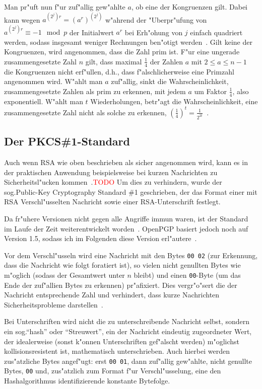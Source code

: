 \documentclass[12pt]{article}
\newcommand{\todo}[1]{\textcolor{red}{\mbox{TODO}}\marginpar{\textcolor{red}{#1}}}
\begin{document}
Man pr"uft nun f"ur zuf"allig gew"ahlte $a$, ob eine der Kongruenzen gilt.
Dabei kann wegen $a^{(2^j)r} = (a^r)^{(2^j)}$ w"ahrend der "Uberpr"ufung von
$a^{(2^j)r} \equiv -1 \mod p$ der Initialwert $a^r$ bei Erh"ohung von $j$ einfach quadriert werden,
sodass insgesamt weniger Rechnungen ben"otigt werden~\cite{hac}.
Gilt keine der Kongruenzen, wird angenommen, dass die Zahl prim ist.
F"ur eine ungerade zusammengesetzte Zahl $n$ gilt,
dass maximal $\frac{1}{4}$ der Zahlen $a$ mit $2 \leq a \leq n-1$ die Kongruenzen nicht erf"ullen,
d.h., dass f"alschlicherweise eine Primzahl angenommen wird.
W"ahlt man $a$ zuf"allig, sinkt die Wahrscheinlichkeit, zusammengesetzte Zahlen als prim zu erkennen,
mit jedem $a$ um Faktor $\frac{1}{4}$, also exponentiell.
W"ahlt man $t$ Wiederholungen, betr"agt die Wahrscheinlichkeit, eine zusammengesetzte Zahl nicht als solche zu erkennen,
$\left(\frac{1}{4}\right)^t = \frac{1}{2^{2t}}$~\cite{hac}.

\subsection{Der PKCS\#1-Standard}

Auch wenn RSA wie oben beschrieben als sicher angenommen wird, kann es in der praktischen
Anwendung beispielsweise bei kurzen Nachrichten zu Sicherheitsl"ucken kommen~\cite{sinews}.\todo{Auch komplett zitieren?}
Um dies zu verhindern, wurde der sog.\@ Public-Key Cryptography Standard \#1 geschrieben,
der das Format einer mit RSA Verschl"usselten Nachricht sowie einer RSA-Unterschrift festlegt.

Da fr"uhere Versionen nicht gegen alle Angriffe immun waren, ist der Standard
im Laufe der Zeit weiterentwickelt worden~\cite{sinews}.
OpenPGP basiert jedoch noch auf Version 1.5, sodass ich im Folgenden diese Version erl"autere~\cite{rfc4480}.

Vor dem Verschl"usseln wird eine Nachricht mit den Bytes \verb|00 02|
(zur Erkennung, dass die Nachricht wie folgt foratiert ist),
so vielen nicht genullten Bytes wie m"oglich (sodass der Gesamtwert unter $n$ bleibt)
und einen \verb|00|-Byte (um das Ende der zuf"allien Bytes zu erkennen) pr"afixiert.
Dies vergr"o"sert die der Nachricht entsprechende Zahl und verhindert,
dass kurze Nachrichten Sicherheitsprobleme darstellen~\cite{rfc4480,sinews}.

Bei Unterschriften wird nicht die zu unterschreibende Nachricht selbst,
sondern ein sog.\@ "`hash"' oder "`Streuwert"', ein der Nachricht eindeutig zugeordneter Wert,
der idealerweise (sonst k"onnen Unterschriften gef"alscht werden) m"oglichst kollisionsresistent ist,
mathematisch unterschrieben.
Auch hierbei werden zus"atzliche Bytes angef"ugt: erst \verb|00 01|, dann zuf"allig gew"ahlte, nicht genullte Bytes,
\verb|00| und, zus"atzlich zum Format f"ur Verschl"usselung, eine den Hashalgorithmus identifizierende konstante Bytefolge.
\end{document}
